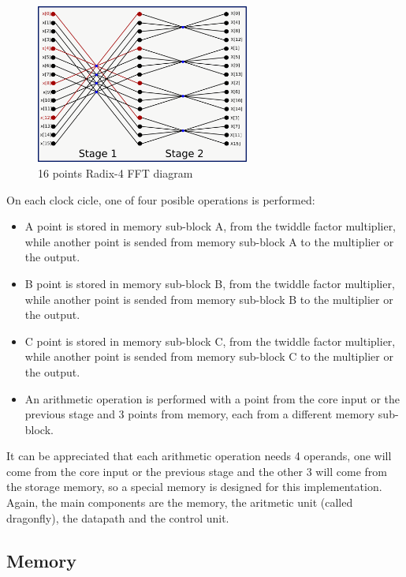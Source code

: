 \documentclass[conference]{IEEEtran}
\begin{document}
\begin{figure}[htb!]
        \centering
        \includegraphics[width=7cm]{./figures/r4_16.png}
        \caption{16 points Radix-4 FFT diagram}
        \label{fig:r4_diag}
\end{figure}

On each clock cicle, one of four posible operations is performed:

\begin{itemize}
  \item A point is stored in memory sub-block A, from the twiddle factor multiplier, while another point is sended from memory 
  sub-block A to the multiplier or the output.
  \item B point is stored in memory sub-block B, from the twiddle factor multiplier, while another point is sended from memory 
  sub-block B to the multiplier or the output.
  \item C point is stored in memory sub-block C, from the twiddle factor multiplier, while another point is sended from memory 
  sub-block C to the multiplier or the output.
  \item An arithmetic operation is performed with a point from the core input or the previous stage and 3 points from memory, each
  from a different memory sub-block. 
\end{itemize}

It can be appreciated that each arithmetic operation needs 4 operands, one will come from the core input or the previous stage and the other
3 will come from the storage memory, so a special memory is designed for this implementation.\\
Again, the main components are the memory, the aritmetic unit (called dragonfly), the datapath and the control unit.

\subsection{Memory}
\end{document}
